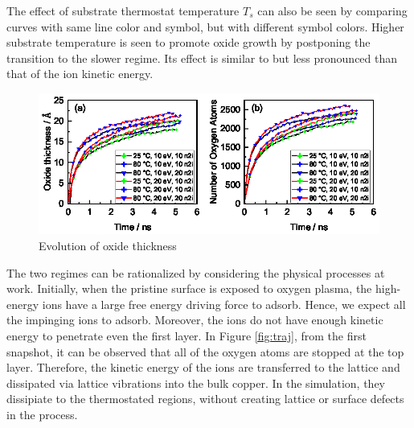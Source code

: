 \documentclass[manuscript=cmatex]{achemso}
\begin{document}
The effect of substrate thermostat temperature $T_s$ can also be seen by comparing curves with same line color and symbol, but with different symbol colors. Higher substrate temperature is seen to promote oxide growth by postponing the transition to the slower regime. Its effect is similar to but less pronounced than that of the ion kinetic energy. 

\begin{figure}[h]
  \centering
  \includegraphics[width=\textwidth]{fig_thicknumo_100}
  \caption[Evolution of oxide thickness]{Evolution of oxide thickness}
  \label{fig:thickness}
\end{figure}

The two regimes can be rationalized by considering the physical processes at work. Initially, when the pristine surface is exposed to oxygen plasma, the high-energy ions have a large free energy driving force to adsorb. Hence, we expect all the impinging ions to adsorb. Moreover, the ions do not have enough kinetic energy to penetrate even the first layer. In Figure \ref{fig:traj}, from the first snapshot, it can be observed that all of the oxygen atoms are stopped at the top layer. Therefore, the kinetic energy of the ions are transferred to the  lattice and dissipated via lattice vibrations into the bulk copper. In the simulation, they dissipiate to the thermostated regions, without creating lattice or surface defects in the process. 
\end{document}
